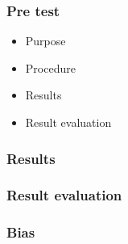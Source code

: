 \subsubsection{Pre test}

\begin{itemize}
\item Purpose
\item Procedure
\item Results
\item Result evaluation
\end{itemize}

\subsubsection{Results}

\subsubsection{Result evaluation}


\subsubsection{Bias}